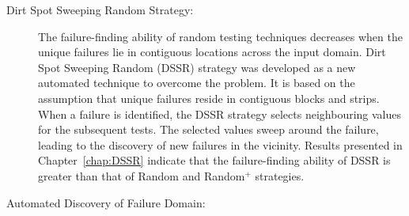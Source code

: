 \begin{description}
\item[Dirt Spot Sweeping Random Strategy:]

The failure-finding ability of random testing techniques decreases when the unique failures lie in contiguous locations across the input domain. Dirt Spot Sweeping Random (DSSR) strategy was developed as a new automated technique to overcome the problem. It is based on the assumption that unique failures reside in contiguous blocks and strips. When a failure is identified, the DSSR strategy selects neighbouring values for the subsequent tests. The selected values sweep around the failure, leading to the discovery of new failures in the vicinity. Results presented in Chapter~\ref{chap:DSSR} indicate that the failure-finding ability of DSSR is greater than that of Random and Random$^+$ strategies.\\

\item[Automated Discovery of Failure Domain:]


\end{description}

